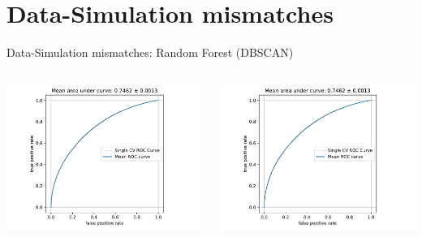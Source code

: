 \section{Data-Simulation mismatches}

\begin{frame}[t]{Data-Simulation mismatches: Random Forest (DBSCAN)}
\begin{columns}[onlytextwidth]
    \begin{column}{0.5\textwidth}
        \includegraphics[width=\textwidth,page=1]{fig/data_mc_separation_DBSCAN.pdf}
    \end{column}
    \begin{column}{0.5\textwidth}
        \includegraphics[width=\textwidth,page=2]{fig/data_mc_separation_DBSCAN.pdf}
    \end{column}
\end{columns}
\end{frame}


